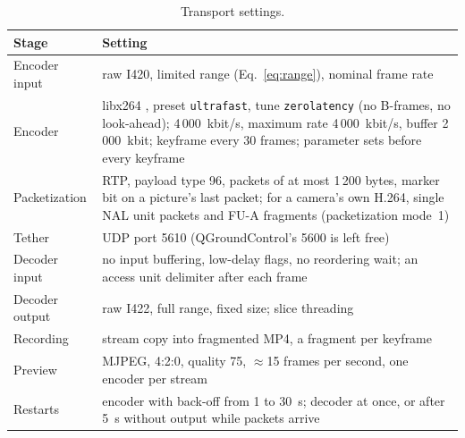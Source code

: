 \begin{table}[!t]
  \centering\small
  \caption{Transport settings.}\label{tab:transport}
  \begin{tabular}{@{}L{3.3cm}L{10.2cm}@{}}
    \toprule
    Stage & Setting \\
    \midrule
    Encoder input & raw I420, limited range (Eq.~\ref{eq:range}),
    nominal frame rate \\
    Encoder & libx264 \cite{x264}, preset \texttt{ultrafast}, tune
    \texttt{zerolatency}
    (no B-frames, no look-ahead); 4\,000~kbit/s, maximum rate 4\,000~kbit/s,
    buffer 2\,000~kbit; keyframe every 30 frames; parameter sets
    before every keyframe \\
    Packetization & RTP, payload type 96, packets of at most 1\,200
    bytes, marker bit
    on a picture's last packet; for a camera's own H.264, single NAL
    unit packets and
    FU-A fragments (packetization mode~1) \\
    Tether & UDP port 5610 (QGroundControl's 5600 is left free) \\
    Decoder input & no input buffering, low-delay flags, no reordering wait;
    an access unit delimiter after each frame \\
    Decoder output & raw I422, full range, fixed size; slice threading \\
    Recording & stream copy into fragmented MP4, a fragment per keyframe \\
    Preview & MJPEG, 4:2:0, quality 75, $\approx$15 frames per
    second, one encoder per stream \\
    Restarts & encoder with back-off from 1 to 30~s; decoder at once,
    or after 5~s
    without output while packets arrive \\
    \bottomrule
  \end{tabular}
\end{table}
